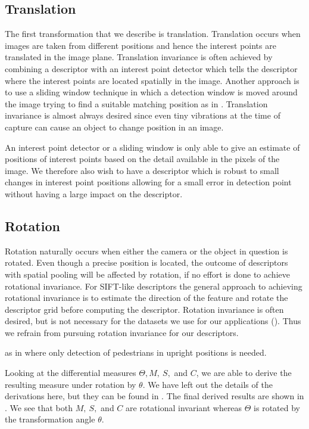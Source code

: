 \documentclass[thesis.tex]{subfiles}
\begin{document}
\subsection{Translation}
The first transformation that we describe is translation. Translation occurs when images are taken from different positions and hence the interest points are translated in the image plane. Translation invariance is often achieved by combining a descriptor with an interest point detector which tells the descriptor where the interest points are located spatially in the image. Another approach is to use a sliding window technique in which a detection window is moved around the image trying to find a suitable matching position as in \cite{felzenszwalb2008discriminatively}. Translation invariance is almost always desired since even tiny vibrations at the time of capture can cause an object to change position in an image.

An interest point detector or a sliding window is only able to give an estimate of positions of interest points based on the detail available in the pixels of the image. We therefore also wish to have a descriptor which is robust to small changes in interest point positions allowing for a small error in detection point without having a large impact on the descriptor.

\subsection{Rotation}
Rotation naturally occurs when either the camera or the object in question is rotated. Even though a precise position is located, the outcome of descriptors with spatial pooling will be affected by rotation, if no effort is done to achieve rotational invariance. For SIFT-like descriptors the general approach to achieving rotational invariance is to estimate the direction of the feature and rotate the descriptor grid before computing the descriptor. Rotation invariance is often desired, but is not necessary for the datasets we use for our applications (). Thus we refrain from pursuing rotation invariance for our descriptors.

as in \cite{dalal2005histograms,felzenszwalb2008discriminatively} where only detection of pedestrians in upright positions is needed.

Looking at the differential measures $\Theta, M,~S,$ and $C$, we are able to derive the resulting measure under rotation by $\theta$. We have left out the details of the derivations here, but they can be found in . The final derived results are shown in . We see that both $M,~S,$ and $C$ are rotational invariant whereas $\Theta$ is rotated by the transformation angle $\theta$.
%
\end{document}
